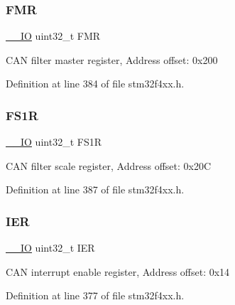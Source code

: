 \subsubsection{\texorpdfstring{F\+MR}{FMR}}
{\footnotesize\ttfamily \hyperlink{group___c_m_s_i_s__core__definitions_gaec43007d9998a0a0e01faede4133d6be}{\+\_\+\+\_\+\+IO} uint32\+\_\+t F\+MR}

C\+AN filter master register, Address offset\+: 0x200 

Definition at line 384 of file stm32f4xx.\+h.

\mbox{\label{struct_c_a_n___type_def_aae0256ae42106ee7f87fc7e5bdb779d4}} 
\subsubsection{\texorpdfstring{F\+S1R}{FS1R}}
{\footnotesize\ttfamily \hyperlink{group___c_m_s_i_s__core__definitions_gaec43007d9998a0a0e01faede4133d6be}{\+\_\+\+\_\+\+IO} uint32\+\_\+t F\+S1R}

C\+AN filter scale register, Address offset\+: 0x20C 

Definition at line 387 of file stm32f4xx.\+h.

\mbox{\label{struct_c_a_n___type_def_a6566f8cfbd1d8aa7e8db046aa35e77db}} 
\subsubsection{\texorpdfstring{I\+ER}{IER}}
{\footnotesize\ttfamily \hyperlink{group___c_m_s_i_s__core__definitions_gaec43007d9998a0a0e01faede4133d6be}{\+\_\+\+\_\+\+IO} uint32\+\_\+t I\+ER}

C\+AN interrupt enable register, Address offset\+: 0x14 

Definition at line 377 of file stm32f4xx.\+h.

\mbox{\label{struct_c_a_n___type_def_a27af4e9f888f0b7b1e8da7e002d98798}} 
